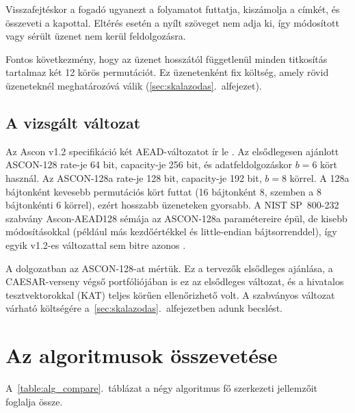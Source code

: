 \documentclass[a4paper,12pt]{report}
\theoremstyle{definition}
\theoremstyle{remark}
\begin{document}
Visszafejtéskor a fogadó ugyanezt a folyamatot futtatja, kiszámolja a címkét, és összeveti a kapottal. Eltérés esetén a nyílt szöveget nem adja ki, így módosított vagy sérült üzenet nem kerül feldolgozásra.

Fontos következmény, hogy az üzenet hosszától függetlenül minden titkosítás tartalmaz két 12 körös permutációt. Ez üzenetenként fix költség, amely rövid üzeneteknél meghatározóvá válik (\ref{sec:skalazodas}.~alfejezet).

\subsection{A vizsgált változat}\label{sec:ascon_valtozat}

Az Ascon v1.2 specifikáció két AEAD-változatot ír le \cite{Dobraunig2021}. Az elsődlegesen ajánlott ASCON-128 rate-je 64 bit, capacity-je 256 bit, és adatfeldolgozáskor $b = 6$ kört használ. Az ASCON-128a rate-je 128 bit, capacity-je 192 bit, $b = 8$ körrel. A 128a bájtonként kevesebb permutációs kört futtat (16 bájtonként 8, szemben a 8 bájtonkénti 6 körrel), ezért hosszabb üzeneteken gyorsabb. A NIST SP~800-232 szabvány Ascon-AEAD128 sémája az ASCON-128a paramétereire épül, de kisebb módosításokkal (például más kezdőértékkel és little-endian bájtsorrenddel), így egyik v1.2-es változattal sem bitre azonos \cite{NISTSP800232}.

A dolgozatban az ASCON-128-at mértük. Ez a tervezők elsődleges ajánlása, a CAESAR-verseny végső portfóliójában is ez az elsődleges változat, és a hivatalos tesztvektorokkal (KAT) teljes körűen ellenőrizhető volt. A szabványos változat várható költségére a~\ref{sec:skalazodas}.~alfejezetben adunk becslést.

\section{Az algoritmusok összevetése}\label{sec:alg_osszehasonlitas}

A~\ref{table:alg_compare}.~táblázat a négy algoritmus fő szerkezeti jellemzőit foglalja össze.
\end{document}
